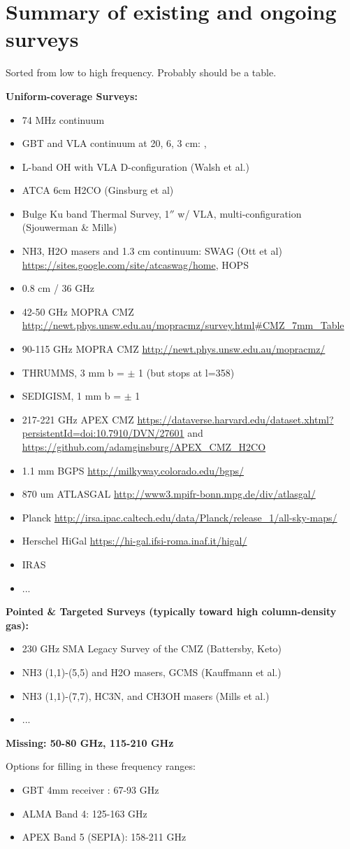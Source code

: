 \section{Summary of existing and ongoing surveys}
Sorted from low to high frequency.  Probably should be a table.

{\bf Uniform-coverage Surveys:}
\begin{itemize}
    \item 74 MHz continuum \citep{Yusef-Zadeh2013c}
    \item GBT and VLA continuum at 20, 6, 3 cm: \citet{Law2008a}, \citet{Law2008b}
    \item L-band OH with VLA D-configuration (Walsh et al.)
    \item ATCA 6cm H2CO (Ginsburg et al)
    \item Bulge Ku band Thermal Survey, 1$''$ w/ VLA, multi-configuration (Sjouwerman \& Mills)
    \item NH3, H2O masers and 1.3 cm continuum: SWAG (Ott et al) \url{https://sites.google.com/site/atcaswag/home}, HOPS \citep{Walsh2011a}
    \item 0.8 cm / 36 GHz \citep{Yusef-Zadeh2013a}
    \item 42-50 GHz MOPRA CMZ \url{http://newt.phys.unsw.edu.au/mopracmz/survey.html#CMZ_7mm_Table} \citep{Jones2013}
    \item 90-115 GHz MOPRA CMZ \url{http://newt.phys.unsw.edu.au/mopracmz/} \citep{Jones2012a}
    \item THRUMMS, 3 mm b = $\pm$ 1 (but stops at l=358)
    \item SEDIGISM, 1 mm b = $\pm$ 1 
    \item 217-221 GHz APEX CMZ \url{https://dataverse.harvard.edu/dataset.xhtml?persistentId=doi:10.7910/DVN/27601} and \url{https://github.com/adamginsburg/APEX_CMZ_H2CO}
    \item 1.1 mm BGPS \url{http://milkyway.colorado.edu/bgps/}
    \item 870 um ATLASGAL \url{http://www3.mpifr-bonn.mpg.de/div/atlasgal/}
    \item Planck \url{http://irsa.ipac.caltech.edu/data/Planck/release_1/all-sky-maps/}
    \item Herschel HiGal \url{https://hi-gal.ifsi-roma.inaf.it/higal/}
    \item IRAS
    \item ...
\end{itemize}

{\bf Pointed & Targeted Surveys (typically toward high column-density gas):}
\begin{itemize}
    \item 230 GHz SMA Legacy Survey of the CMZ (Battersby, Keto)
    \item NH3 (1,1)-(5,5) and H2O masers, GCMS (Kauffmann et al.)
    \item NH3 (1,1)-(7,7), HC3N, and CH3OH masers (Mills et al.)
    \item ...
\end{itemize}

{\bf Missing: 50-80 GHz, 115-210 GHz}

Options for filling in these frequency ranges:
\begin{itemize}
\item GBT 4mm receiver : 67-93 GHz
\item ALMA Band 4: 125-163 GHz
\item APEX Band 5 (SEPIA): 158-211 GHz
\end{itemize}